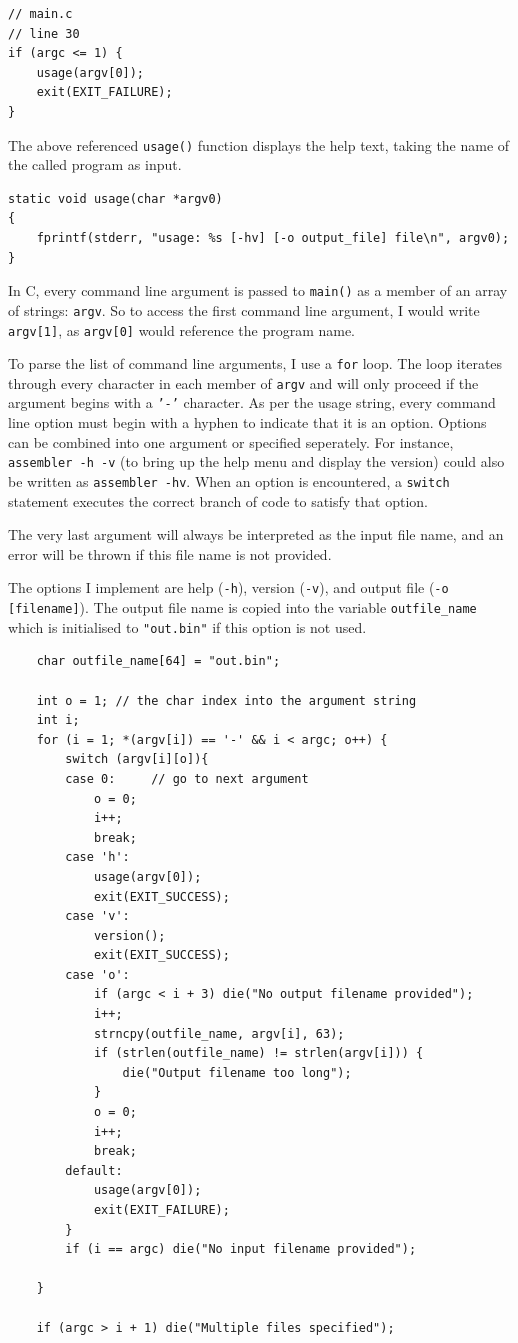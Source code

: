 \documentclass[a4paper]{report}
\begin{document}
\begin{lstlisting}
// main.c
// line 30
if (argc <= 1) {
	usage(argv[0]);
	exit(EXIT_FAILURE);
}
\end{lstlisting}

The above referenced \texttt{usage()} function displays the help text, taking
the name of the called program as input.

\begin{lstlisting}
static void usage(char *argv0)
{
    fprintf(stderr, "usage: %s [-hv] [-o output_file] file\n", argv0);
}
\end{lstlisting}

In C, every command line argument is passed to \texttt{main()} as a member of an
array of strings: \texttt{argv}. So to access the first command line argument, I
would write \texttt{argv[1]}, as \texttt{argv[0]} would reference the program
name.

To parse the list of command line arguments, I use a \texttt{for} loop. The
loop iterates through every character in each member of \texttt{argv} and will
only proceed if the argument begins with a \texttt{'-'} character. As per the
usage string, every command line option must begin with a hyphen to indicate
that it is an option. Options can be combined into one argument or specified
seperately. For instance, \texttt{assembler -h -v} (to bring up the help menu
and display the version) could also be written as \texttt{assembler -hv}. When
an option is encountered, a \texttt{switch} statement executes the correct
branch of code to satisfy that option.

The very last argument will always be interpreted as the input file name, and
an error will be thrown if this file name is not provided.

The options I implement are help (\texttt{-h}), version (\texttt{-v}), and
output file (\texttt{-o [filename]}). The output file name is copied into the
variable \texttt{outfile\_name} which is initialised to \texttt{"out.bin"} if
this option is not used.

\begin{lstlisting}
	char outfile_name[64] = "out.bin";

	int o = 1; // the char index into the argument string
    int i;
    for (i = 1; *(argv[i]) == '-' && i < argc; o++) {
        switch (argv[i][o]){
        case 0:     // go to next argument
            o = 0;
            i++;
            break;
        case 'h':
            usage(argv[0]);
            exit(EXIT_SUCCESS);
        case 'v':
            version();
			exit(EXIT_SUCCESS);
		case 'o':
			if (argc < i + 3) die("No output filename provided");
			i++;
			strncpy(outfile_name, argv[i], 63);
			if (strlen(outfile_name) != strlen(argv[i])) {
				die("Output filename too long");
			}
			o = 0;
			i++;
			break;
        default:
			usage(argv[0]);
			exit(EXIT_FAILURE);
        }
        if (i == argc) die("No input filename provided");

    }

	if (argc > i + 1) die("Multiple files specified");
\end{lstlisting}
\end{document}
